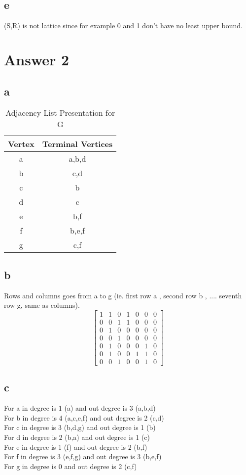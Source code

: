 \documentclass[11pt]{article}
\begin{document}
\subsection*{e}
(S,R) is not lattice since for example 0 and 1 don't have no least upper bound.
\section*{Answer 2}
\subsection*{a}
\begin{table}[H]
\small
\centering
\caption{ Adjacency List Presentation for G }
\label{table:example}
\begin{tabular}{|c|c|}	%
\hline 							%
\textbf{Vertex} & \textbf{Terminal Vertices}  \\
\hline 
\hline 
a & a,b,d \\ \hline			%
b & c,d  \\ \hline
c & b \\ \hline
d & c \\ \hline
e & b,f \\ \hline
f & b,e,f \\ \hline
g & c,f \\ 
\hline 

\end{tabular}
\end{table}
\subsection*{b}
Rows and columns goes from a to g (ie. first row a , second row b , .... seventh row g, same as columns). \\
\[
\begin{bmatrix}
    1 & 1 & 0 & 1 & 0 & 0 & 0 \\
    0 & 0 & 1 & 1 & 0 & 0 & 0 \\
    0 & 1 & 0 & 0 & 0 & 0 & 0 \\
    0 & 0 & 1 & 0 & 0 & 0 & 0 \\
    0 & 1 & 0 & 0 & 0 & 1 & 0 \\
    0 & 1 & 0 & 0 & 1 & 1 & 0 \\
    0 & 0 & 1 & 0 & 0 & 1 & 0 
    
\end{bmatrix}
\]
\subsection*{c}
For a in degree is 1 (a) and out degree is 3 (a,b,d) \\
For b in degree is 4 (a,c,e,f) and out degree is 2 (c,d) \\
For c in degree is 3 (b,d,g) and out degree is 1 (b) \\
For d in degree is 2 (b,a) and out degree is 1 (c) \\
For e in degree is 1 (f) and out degree is 2 (b,f) \\
For f in degree is 3 (e,f,g) and out degree is 3 (b,e,f) \\
For g in degree is 0 and out degree is 2 (c,f)
\end{document}
